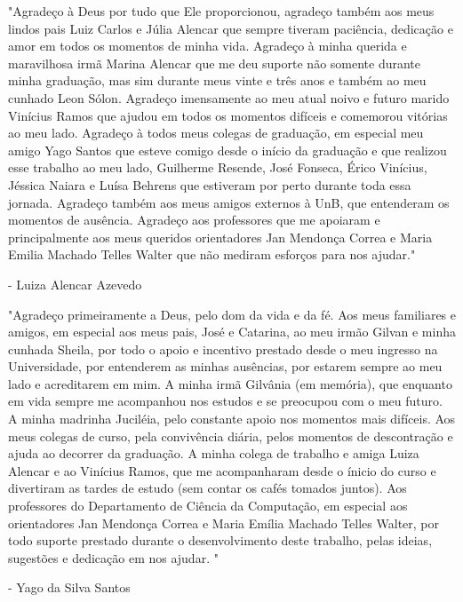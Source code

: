 \documentclass[licenciatura]{unb-cic}
\begin{document}
  \begin{agradecimentos}
   	
   	\begin{center}
   		"Agradeço à Deus por tudo que Ele proporcionou, agradeço também aos meus lindos pais Luiz Carlos e Júlia Alencar que sempre tiveram paciência, dedicação e amor em todos os momentos de minha vida. Agradeço à minha querida e maravilhosa irmã Marina Alencar que me deu suporte não somente durante minha graduação, mas sim durante meus vinte e três anos e também ao meu cunhado Leon Sólon. Agradeço imensamente ao meu atual noivo e futuro marido Vinícius Ramos que ajudou em todos os momentos difíceis e comemorou vitórias ao meu lado. 
   		\newline
   		Agradeço à todos meus colegas de graduação, em especial meu amigo Yago Santos que esteve comigo desde o início da graduação e que realizou esse trabalho ao meu lado, Guilherme Resende, José Fonseca, Érico Vinícius, Jéssica Naiara e Luísa Behrens que estiveram por perto durante toda essa jornada. Agradeço também aos meus amigos externos à UnB, que entenderam os momentos de ausência.
   		\newline
   		Agradeço aos professores que me apoiaram e principalmente aos meus queridos orientadores Jan Mendonça Correa e Maria Emilia Machado Telles Walter que não mediram esforços para nos ajudar."
   		
   		- Luiza Alencar Azevedo
   	\end{center}
   	
   	\begin{center}
   		"Agradeço primeiramente a Deus, pelo dom da vida e da fé. Aos meus familiares e amigos, em especial aos meus pais, José e Catarina, ao meu irmão Gilvan e minha cunhada Sheila, por todo o apoio e incentivo prestado desde o meu ingresso na Universidade, por entenderem as minhas ausências, por estarem sempre ao meu lado e acreditarem em mim. A minha irmã Gilvânia (em memória), que enquanto em vida sempre me acompanhou nos estudos e se preocupou com o meu futuro. A minha madrinha Juciléia, pelo constante apoio nos momentos mais difíceis.  Aos meus colegas de curso, pela convivência diária, pelos momentos de descontração e ajuda ao decorrer da graduação. A minha colega de trabalho e amiga Luiza Alencar e ao Vinícius Ramos, que me acompanharam desde o ínicio do curso e divertiram as tardes de estudo (sem contar os cafés tomados juntos). Aos professores do Departamento de Ciência da Computação, em especial aos orientadores Jan Mendonça Correa e Maria Emília Machado Telles Walter, por todo suporte prestado durante o desenvolvimento deste trabalho, pelas ideias, sugestões e dedicação em nos ajudar. "
   		
   		- Yago da Silva Santos
   	\end{center}
   	
  \end{agradecimentos}
\end{document}
